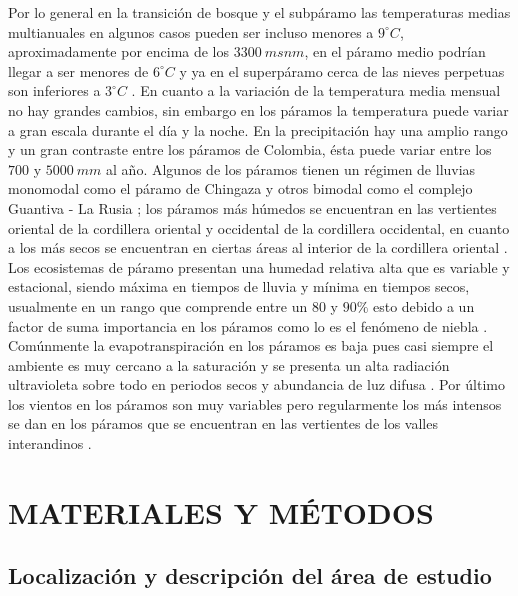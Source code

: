 \documentclass[conference,final,]{IEEEtran}
\begin{document}
Por lo general en la transición de bosque y el subpáramo las
temperaturas medias multianuales en algunos casos pueden ser incluso
menores a \(9^{\circ}C\), aproximadamente por encima de los
\(3300 \ msnm\), en el páramo medio podrían llegar a ser menores de
\(6^{\circ}C\) y ya en el superpáramo cerca de las nieves perpetuas son
inferiores a \(3^{\circ}C\) \citep{morales2019atlas}. En cuanto a la
variación de la temperatura media mensual no hay grandes cambios, sin
embargo en los páramos la temperatura puede variar a gran escala durante
el día y la noche. En la precipitación hay una amplio rango y un gran
contraste entre los páramos de Colombia, ésta puede variar entre los
\(700\) y \(5000 \ mm\) al año. Algunos de los páramos tienen un régimen
de lluvias monomodal como el páramo de Chingaza \citep{morales2019atlas}
y otros bimodal como el complejo Guantiva - La Rusia
\citep{morales2019atlas}; los páramos más húmedos se encuentran en las
vertientes oriental de la cordillera oriental y occidental de la
cordillera occidental, en cuanto a los más secos se encuentran en
ciertas áreas al interior de la cordillera oriental
\citep{morales2019atlas}. Los ecosistemas de páramo presentan una humedad
relativa alta que es variable y estacional, siendo máxima en tiempos de
lluvia y mínima en tiempos secos, usualmente en un rango que comprende
entre un \(80\) y \(90 \%\) esto debido a un factor de suma importancia
en los páramos como lo es el fenómeno de niebla \citep{morales2019atlas}.
Comúnmente la evapotranspiración en los páramos es baja pues casi
siempre el ambiente es muy cercano a la saturación y se presenta un alta
radiación ultravioleta sobre todo en periodos secos y abundancia de luz
difusa \citep{morales2019atlas}. Por último los vientos en los páramos
son muy variables pero regularmente los más intensos se dan en los
páramos que se encuentran en las vertientes de los valles interandinos
\citep{morales2019atlas}.

\hypertarget{materiales-y-muxe9todos}{%
\section{MATERIALES Y MÉTODOS}\label{materiales-y-muxe9todos}}

\hypertarget{localizaciuxf3n-y-descripciuxf3n-del-uxe1rea-de-estudio}{%
\subsection{Localización y descripción del área de
estudio}\label{localizaciuxf3n-y-descripciuxf3n-del-uxe1rea-de-estudio}}
\end{document}
